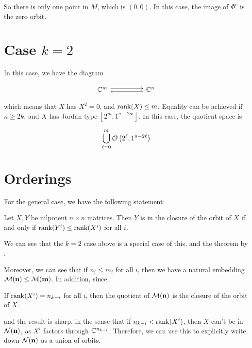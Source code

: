 \documentclass{article}
\begin{document}
So there is only one point in \(M\), which is \((0, 0)\). In this case, the image of \(\Phi^c\) is the zero orbit.

\section*{Case \(k=2\)}

In this case, we have the diagram

\[\begin{tikzcd}
	{\C^m} && {\C^n}
	\arrow[shift left=1, from=1-1, to=1-3]
	\arrow[shift left=1, from=1-3, to=1-1]
\end{tikzcd}\]

which means that \(X\) has \(X^2 = 0\), and \(\rank(X) \le m\). Equality can be achieved if \(n \ge 2k\), and \(X\) has Jordan type \([2^m, 1^{n-2m}]\). In this case, the quotient space is

\[\bigcup_{\ell = 0}^m \mathcal{O}\left(2^\ell, 1^{n-2\ell}\right)\]

\section*{Orderings}

For the general case, we have the following statement:

\begin{theorem*}
	Let \(X, Y\) be nilpotent \(n \times n\) matrices. Then \(Y\) is in the closure of the orbit of \(X\) if and only if \(\rank(Y^i) \le \rank(X^i)\) for all \(i\).
\end{theorem*}

We can see that the \(k=2\) case above is a special case of this, and the theorem by .

Moreover, we can see that if \(n_i \le m_i\) for all \(i\), then we have a natural embedding \(\mathcal{M}(\mathbf n) \le \mathcal{M}(\mathbf m)\). In addition, since

\begin{theorem*}
	If \(\rank(X^i) = n_{k-i}\) for all \(i\), then the quotient of \(\mathcal{M}(\mathbf n)\) is the closure of the orbit of \(X\).
\end{theorem*}

and the result is sharp, in the sense that if \(n_{k-i} < \rank(X^i)\), then \(X\) can't be in \(\mathcal{N}(\mathbf n)\), as \(X^i\) factors through \(\mathbb{C}^{n_{k-i}}\). Therefore, we can use this to explicitly write down \(\mathcal{N}(\mathbf n)\) as a union of orbits.
\end{document}

